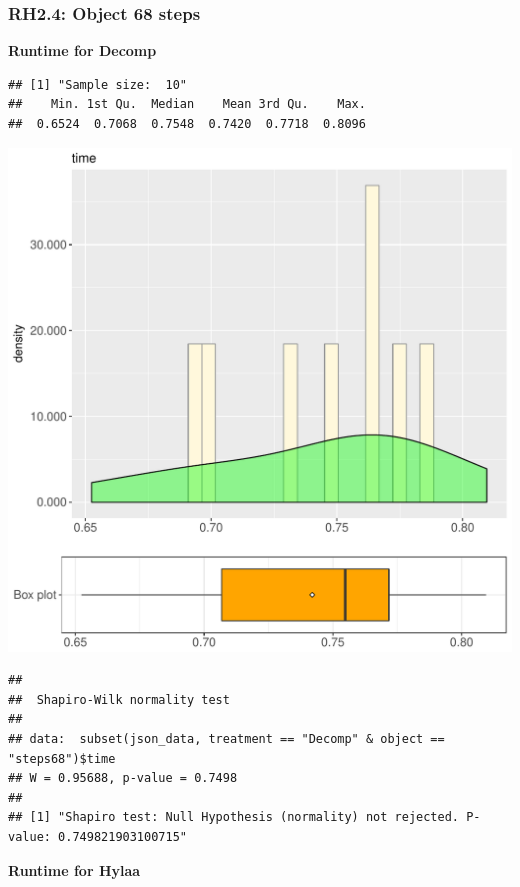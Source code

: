 \documentclass{article}\usepackage[]{graphicx}\usepackage[]{color}
\makeatletter
\def\maxwidth{ %
  \ifdim\Gin@nat@width>\linewidth
    \linewidth
  \else
    \Gin@nat@width
  \fi
}
\newenvironment{kframe}{%
 \def\at@end@of@kframe{}%
 \ifinner\ifhmode%
  \def\at@end@of@kframe{\end{minipage}}%
  \begin{minipage}{\columnwidth}%
 \fi\fi%
 \def\FrameCommand##1{\hskip\@totalleftmargin \hskip-\fboxsep
 \colorbox{shadecolor}{##1}\hskip-\fboxsep
     \hskip-\linewidth \hskip-\@totalleftmargin \hskip\columnwidth}%
 \MakeFramed {\advance\hsize-\width
   \@totalleftmargin\z@ \linewidth\hsize
   \@setminipage}}%
 {\par\unskip\endMakeFramed%
 \at@end@of@kframe}
\newenvironment{knitrout}{}{} %
\makeatother
\begin{document}
\subsubsection{RH2.4: Object 68 steps}

 \textbf{Runtime for Decomp}
\begin{knitrout}
\color{fgcolor}\begin{kframe}
\begin{verbatim}
## [1] "Sample size:  10"
##    Min. 1st Qu.  Median    Mean 3rd Qu.    Max. 
##  0.6524  0.7068  0.7548  0.7420  0.7718  0.8096
\end{verbatim}
\end{kframe}
\includegraphics[width=\maxwidth]{figure/RH2_Decomp_steps68-1} 
\begin{kframe}\begin{verbatim}
## 
## 	Shapiro-Wilk normality test
## 
## data:  subset(json_data, treatment == "Decomp" & object == "steps68")$time
## W = 0.95688, p-value = 0.7498
## 
## [1] "Shapiro test: Null Hypothesis (normality) not rejected. P-value: 0.749821903100715"
\end{verbatim}
\end{kframe}
\end{knitrout}
 \textbf{Runtime for Hylaa}
\end{document}
